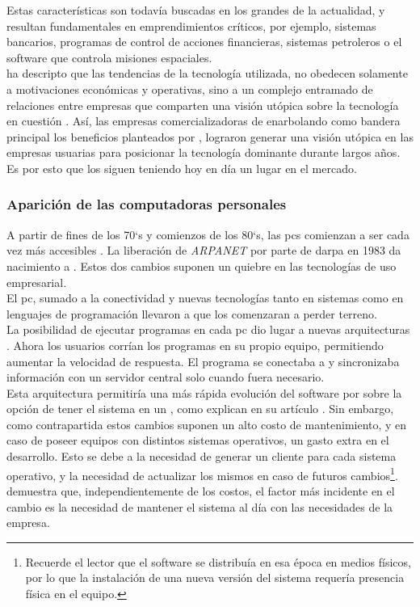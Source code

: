 Estas características son todavía buscadas en los grandes \mainframes de la actualidad,
y resultan fundamentales en emprendimientos críticos, por ejemplo, sistemas bancarios,
programas de control de acciones financieras, sistemas petroleros o el software que
controla misiones espaciales.\\
 ha descripto que las tendencias de la
tecnología utilizada, no obedecen solamente a motivaciones económicas y operativas, sino
a un complejo entramado de relaciones entre empresas que comparten una visión utópica
sobre la tecnología en cuestión . Así, las empresas
comercializadoras de \mainframes enarbolando como bandera principal los beneficios
planteados por \citeauthor{Stephens:2008:BOOK}, lograron generar una visión utópica en
las empresas usuarias para posicionar la tecnología dominante durante largos años.
Es por esto que los \mainframes siguen teniendo hoy en día un lugar en el mercado.\\
 
\subsubsection{Aparición de las computadoras personales}
\label{subsubsec:intro:about_web:pc_era}

A partir de fines de los 70`s y comienzos de los 80`s, las \acp{pc}
comienzan a ser cada vez más accesibles .
La liberación de \emph{ARPANET} por parte de \acs{darpa} en 1983 da nacimiento
a \internet. Estos dos cambios suponen un quiebre en las tecnologías de uso
empresarial.\\
El \ac{pc}, sumado a la conectividad y nuevas tecnologías tanto en sistemas como en
lenguajes de programación llevaron a que los \mainframes comenzaran a perder terreno.\\
La posibilidad de ejecutar programas en cada \ac{pc} dio lugar a nuevas arquitecturas
\clientserver. Ahora los usuarios corrían los programas en su propio equipo, permitiendo
aumentar la velocidad de respuesta. El programa se conectaba a \internet y sincronizaba
información con un servidor central solo cuando fuera necesario.\\
Esta arquitectura permitiría una más rápida evolución del software por sobre la opción de
tener el sistema en un \mainframe, como explican  
en su artículo . Sin embargo, como contrapartida  estos
cambios suponen un alto costo de mantenimiento, y en caso de poseer equipos con distintos
sistemas operativos, un gasto extra en el desarrollo. Esto se debe a la necesidad de
generar un cliente para cada sistema operativo, y la necesidad de actualizar los mismos
en caso de futuros cambios\footnote{
	Recuerde el lector que el software se distribuía en esa época en medios físicos, por
	lo que la instalación de una nueva versión del sistema requería presencia física en el
	equipo.
}.
demuestra que, independientemente de los costos, el factor más incidente en el cambio es
la necesidad de mantener el sistema al día con las necesidades de la empresa.


